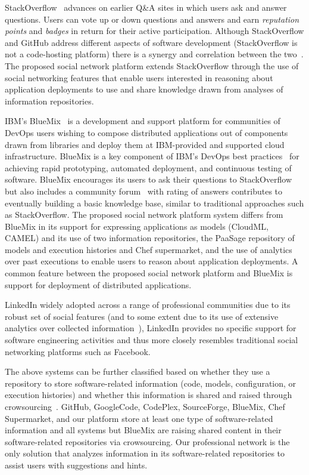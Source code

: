 StackOverflow~\cite{stackoverflow} advances on earlier Q\&A sites in which users ask and answer questions. Users can vote up or down questions and answers and earn \emph{reputation points} and \emph{badges} in return for their active participation. 
Although StackOverflow and GitHub address different aspects of software development (StackOverflow is not a code-hosting platform) there is a synergy and correlation between the two~\cite{stackgit}. The proposed social network platform extends StackOverflow through the use of social networking features that enable users interested in reasoning about application deployments to use and share knowledge drawn from analyses of information repositories.
 
IBM's BlueMix~\cite{Bluemix-dev} is a development and support platform for communities of DevOps users wishing to compose distributed applications out of components drawn from libraries and deploy them at IBM-provided and supported cloud infrastructure.  BlueMix is a key component of IBM's DevOps best practices~\cite{ibm-devops} for achieving rapid prototyping, automated deployment, and continuous testing of software. BlueMix encourages its users to ask their questions to StackOverflow but also includes a community forum~\cite{Bluemix-dev} with rating of answers contributes to eventually building a basic knowledge base, similar to traditional approaches such as StackOverflow.  The proposed social network platform system differs from BlueMix in its support for expressing applications as models (CloudML, CAMEL) and its use of two information repositories, the PaaSage repository of models and execution histories and Chef supermarket, and the use of analytics over past executions to enable users to reason about application deployments. A common feature between the proposed social network platform and BlueMix is support for deployment of distributed applications. 

LinkedIn widely adopted across a range of professional communities due to its robust set of social features (and to some extent due to its use of extensive analytics over collected information~\cite{sumbaly2013big}), LinkedIn provides no specific support for software engineering activities and thus more closely resembles traditional social networking platforms such as Facebook.

The above systems can be further classified based on whether they use a repository to store software-related information (code, models, configuration, or execution histories) and whether this information is shared and raised through crowsourcing~\cite{	howe2006rise}.  GitHub, GoogleCode, CodePlex, SourceForge, BlueMix, Chef Supermarket, and our platform store at least one type of software-related information and all systems but BlueMix are raising shared content in their software-related repositories via crowsourcing. Our professional network is the only solution that analyzes information in its software-related repositories to assist users with suggestions and hints. 

